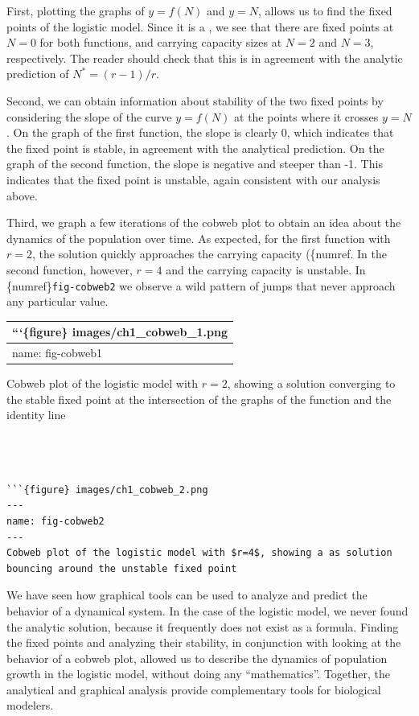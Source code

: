 \documentclass[
  letterpaper,
  DIV=11,
  numbers=noendperiod]{scrreprt}
\begin{document}
First, plotting the graphs of \(y=f(N)\) and \(y=N\), allows us to find
the fixed points of the logistic model. Since it is a , we see that
there are fixed points at \(N = 0\) for both functions, and carrying
capacity sizes at \(N=2\) and \(N=3\), respectively. The reader should
check that this is in agreement with the analytic prediction of
\(N^* = (r-1)/r\).

Second, we can obtain information about stability of the two fixed
points by considering the slope of the curve \(y=f(N)\) at the points
where it crosses \(y=N\). On the graph of the first function, the slope
is clearly 0, which indicates that the fixed point is stable, in
agreement with the analytical prediction. On the graph of the second
function, the slope is negative and steeper than -1. This indicates that
the fixed point is unstable, again consistent with our analysis above.

Third, we graph a few iterations of the cobweb plot to obtain an idea
about the dynamics of the population over time. As expected, for the
first function with \(r=2\), the solution quickly approaches the
carrying capacity (\{numref. In the second function, however, \(r = 4\)
and the carrying capacity is unstable. In \{numref\}\texttt{fig-cobweb2}
we observe a wild pattern of jumps that never approach any particular
value.

\begin{longtable}[]{@{}l@{}}
\toprule()
```\{figure\} images/ch1\_cobweb\_1.png \\
\midrule()
\endhead
name: fig-cobweb1 \\
\bottomrule()
\end{longtable}

Cobweb plot of the logistic model with \(r=2\), showing a solution
converging to the stable fixed point at the intersection of the graphs
of the function and the identity line

\begin{verbatim}



```{figure} images/ch1_cobweb_2.png
---
name: fig-cobweb2
---
Cobweb plot of the logistic model with $r=4$, showing a as solution bouncing around the unstable fixed point
\end{verbatim}

We have seen how graphical tools can be used to analyze and predict the
behavior of a dynamical system. In the case of the logistic model, we
never found the analytic solution, because it frequently does not exist
as a formula. Finding the fixed points and analyzing their stability, in
conjunction with looking at the behavior of a cobweb plot, allowed us to
describe the dynamics of population growth in the logistic model,
without doing any ``mathematics''. Together, the analytical and
graphical analysis provide complementary tools for biological modelers.
\end{document}
